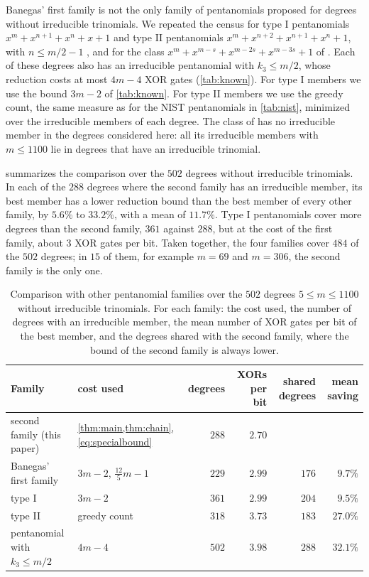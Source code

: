 \documentclass{ieeeaccess}
\theoremstyle{plain}
\theoremstyle{definition}
\begin{document}
Banegas' first family is not the only family of pentanomials proposed for
degrees without irreducible trinomials. We repeated the census for type I
pentanomials $x^m+x^{n+1}+x^n+x+1$ and type II pentanomials
$x^m+x^{n+2}+x^{n+1}+x^n+1$, with $n\le m/2-1$ \cite{RodriguezKoc2003}, and for
the class $x^m+x^{m-s}+x^{m-2s}+x^{m-3s}+1$ of \cite{ReyhaniHasan2004}. Each of
these degrees also has an irreducible pentanomial with $k_3\le m/2$, whose
reduction costs at most $4m-4$ XOR gates (\cref{tab:known}). For type I members we use the
bound $3m-2$ of \cref{tab:known}. For type II members we use the greedy count,
the same measure as for the NIST pentanomials in \cref{tab:nist}, minimized over
the irreducible members of each degree. The class of \cite{ReyhaniHasan2004}
has no irreducible member in the degrees considered here: all its irreducible
members with $m\le1100$ lie in degrees that have an irreducible trinomial.

 summarizes the comparison over the $502$ degrees without
irreducible trinomials. In each of the $288$ degrees where the second family
has an irreducible member, its best member has a lower reduction bound than the best member of
every other family, by $5.6\%$ to $33.2\%$, with a mean of $11.7\%$. Type I
pentanomials cover more degrees than the second family, $361$ against $288$,
but at the cost of the first family, about $3$ XOR gates per bit. Taken
together, the four families cover $484$ of the $502$ degrees; in $15$ of them,
for example $m=69$ and $m=306$, the second family is the only one.

\begin{table}[t]
\centering\small
\caption{Comparison with other pentanomial families over the $502$ degrees
$5\le m\le1100$ without irreducible trinomials. For each family: the cost used,
the number of degrees with an irreducible member, the mean number of XOR gates
per bit of the best member, and the degrees shared with the second family,
where the bound of the second family is always lower.}
\label{tab:others}
\begin{tabular}{@{}l l r r r r@{}}
\toprule
Family & cost used & degrees & XORs per bit & shared degrees & mean saving\\
\midrule
second family (this paper) & \cref{thm:main,thm:chain}, \eqref{eq:specialbound} & $288$ & $2.70$ & & \\
Banegas' first family & $3m-2$, $\tfrac{12}5m-1$ \cite{BCP2019} & $229$ & $2.99$ & $176$ & $9.7\%$\\
type I & $3m-2$ \cite{ReyhaniHasan2004} & $361$ & $2.99$ & $204$ & $9.5\%$\\
type II & greedy count & $318$ & $3.73$ & $183$ & $27.0\%$\\
pentanomial with $k_3\le m/2$ & $4m-4$ \cite{ReyhaniHasan2004} & $502$ & $3.98$ & $288$ & $32.1\%$\\
\bottomrule
\end{tabular}
\end{table}
\end{document}
